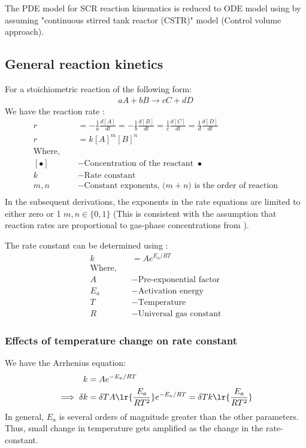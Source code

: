 The PDE model for SCR reaction kinematics \cite{nova2014urea} is reduced to ODE model \cite{devarakonda2008adequacy} using by assuming "continuous stirred tank reactor (CSTR)" model (Control volume approach).


\subsection{General reaction kinetics}
For a stoichiometric reaction of the following form:
\begin{align*}
    a A + b B \longrightarrow c C + d D
\end{align*}
We have the reaction rate \cite{chem_kine}:
\begin{align*}
    r &= -\frac{1}{a} \frac{d [A]}{dt}
       = -\frac{1}{b} \frac{d [B]}{dt}
       = \frac{1}{c}  \frac{d [C]}{dt}
       = \frac{1}{d}  \frac{d [D]}{dt}\\
    r &= k [A]^m [B]^n\\
    \text{Where, }\quad &\\
    [\bullet] &- \text{Concentration of the reactant } \bullet\\
    k &- \text{Rate constant}\\
    m, n &- \text{Constant exponents, ($m+n$) is the order of reaction}\\
\end{align*}
In the subsequent derivations, the exponents in the rate equations are limited
to either zero or 1 $m, n \in \{0, 1\}$ (This is consistent with the assumption
that reaction rates are proportional to gas-phase concentrations from \cite{devarakonda2009model}).

The rate constant can be determined using :
\begin{align*}
    k &= A e^{E_a/RT}\\
    \text{Where,} \quad &\\
    A &- \text{Pre-exponential factor}\\
    E_a &- \text{Activation energy}\\
    T &- \text{Temperature}\\
    R &- \text{Universal gas constant}
\end{align*}
\subsubsection{Effects of temperature change on rate constant}
We have the Arrhenius equation:
\begin{align*}
    k &= A e^{-E_a/RT}\\
    \implies \delta k &= \delta T A \lr{\frac{E_a}{RT^2}} e^{-E_a/RT} = \delta T k \lr{\frac{E_a}{RT^2}}\\
\end{align*}
In general, $E_a$ is several orders of magnitude greater than the other
parameters. Thus, small change in temperature gets amplified as the change in
the rate-constant.

